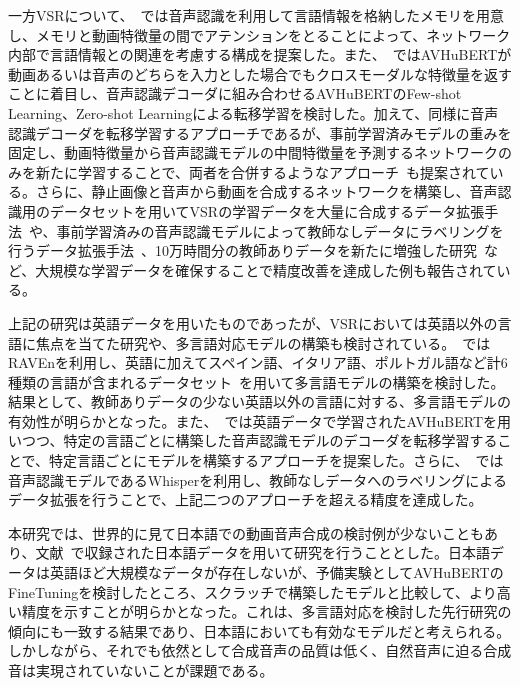 \documentclass[12pt]{jarticle}
\numberwithin{equation}{section}    %
\numberwithin{figure}{section}      %
\numberwithin{table}{section}      %
\begin{document}
一方VSRについて、~\cite{yeo2024akvsr}では音声認識を利用して言語情報を格納したメモリを用意し、メモリと動画特徴量の間でアテンションをとることによって、ネットワーク内部で言語情報との関連を考慮する構成を提案した。また、~\cite{cheng2023opensr}ではAVHuBERTが動画あるいは音声のどちらを入力とした場合でもクロスモーダルな特徴量を返すことに着目し、音声認識デコーダに組み合わせるAVHuBERTのFew-shot Learning、Zero-shot Learningによる転移学習を検討した。加えて、同様に音声認識デコーダを転移学習するアプローチであるが、事前学習済みモデルの重みを固定し、動画特徴量から音声認識モデルの中間特徴量を予測するネットワークのみを新たに学習することで、両者を合併するようなアプローチ~\cite{djilali2023lip2vec}も提案されている。さらに、静止画像と音声から動画を合成するネットワークを構築し、音声認識用のデータセットを用いてVSRの学習データを大量に合成するデータ拡張手法~\cite{liu2023synthvsr}や、事前学習済みの音声認識モデルによって教師なしデータにラベリングを行うデータ拡張手法~\cite{ma2023auto}、10万時間分の教師ありデータを新たに増強した研究~\cite{chang2024conformer}など、大規模な学習データを確保することで精度改善を達成した例も報告されている。

上記の研究は英語データを用いたものであったが、VSRにおいては英語以外の言語に焦点を当てた研究や、多言語対応モデルの構築も検討されている。~\cite{zinonos2023learning}ではRAVEnを利用し、英語に加えてスペイン語、イタリア語、ポルトガル語など計6種類の言語が含まれるデータセット~\cite{ephrat2018looking,salesky2021multilingual,zhao2019cascade}を用いて多言語モデルの構築を検討した。結果として、教師ありデータの少ない英語以外の言語に対する、多言語モデルの有効性が明らかとなった。また、~\cite{kim2023lip_vsr}では英語データで学習されたAVHuBERTを用いつつ、特定の言語ごとに構築した音声認識モデルのデコーダを転移学習することで、特定言語ごとにモデルを構築するアプローチを提案した。さらに、~\cite{yeo2023visual}では音声認識モデルであるWhisperを利用し、教師なしデータへのラベリングによるデータ拡張を行うことで、上記二つのアプローチを超える精度を達成した。

本研究では、世界的に見て日本語での動画音声合成の検討例が少ないこともあり、文献~\cite{taguchi,esaki}で収録された日本語データを用いて研究を行うこととした。日本語データは英語ほど大規模なデータが存在しないが、予備実験としてAVHuBERTのFineTuningを検討したところ、スクラッチで構築したモデルと比較して、より高い精度を示すことが明らかとなった。これは、多言語対応を検討した先行研究の傾向にも一致する結果であり、日本語においても有効なモデルだと考えられる。しかしながら、それでも依然として合成音声の品質は低く、自然音声に迫る合成音は実現されていないことが課題である。
\end{document}
